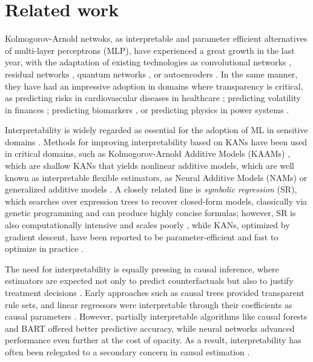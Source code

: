 \section{Related work}
\label{sec:related_work}

Kolmogorov-Arnold netwoks, as interpretable and parameter efficient alternatives of multi-layer perceptrons (MLP), have experienced a great growth in the last year, with the adaptation of existing technologies as convolutional networks \citep{bodner2024convolutional}, residual networks \citep{yu2024residual}, quantum networks \citep{wakaura2025enhanced}, or autoencoders \citep{moradi2024kolmogorovarnoldnetworkautoencoders}. In the same manner, they have had an impressive adoption in domains where transparency is critical, as predicting risks in cardiovascular diseases \citep{al2025kolmogorov} in healthcare \citep{pendyala25effectiveness, pati25kaam}; predicting volatility in finances \citep{CHO2025128781}; predicting biomarkers \citep{alharbi25biomarker}, or predicting physics in power systems \citep{Shuai_2025_powersystems}.

Interpretability is widely regarded as essential for the adoption of ML in sensitive domains \citep{DoshiVelez2017TowardsAR}. Methods for improving interpretability based on KANs have been used in critical domains, such as Kolmogorov-Arnold Additive Models (KAAMs) \citep{pati25kaam}, which are shallow KANs that yields nonlinear additive models, which are well known as interpretable flexible estimators, as Neural Additive Models (NAMs) \citep{agarwal21neural} or generalized additive models \citep{caruana2015intelligible}. A closely related line is \emph{symbolic regression} (SR), which searches over expression trees to recover closed-form models, classically via genetic programming \citep{schmidt09distilling} and can produce highly concise formulas; however, SR is also computationally intensive and scales poorly \citep{ZhangGPU2022}, while KANs, optimized by gradient descent, have been reported to be parameter-efficient and fast to optimize in practice \citep{liu2024kan}.

The need for interpretability is equally pressing in causal inference, where estimators are expected not only to predict counterfactuals but also to justify treatment decisions \citep{athey15recursive}. Early approaches such as causal trees \citep{athey15recursive} provided transparent rule sets, and linear regressors were interpretable through their coefficients as causal parameters \citep{hahn18regularization}. However, partially interpretable algorithms like causal forests \citep{Foster2011SubgroupIF} and BART \citep{hill11bayesian} offered better predictive accuracy, while neural networks advanced performance even further \citep{shalit2017estimating, johansson16learning, schwab2018perfect, yoon2018ganite, yao2018representation} at the cost of opacity. As a result, interpretability has often been relegated to a secondary concern in causal estimation \citep{Rudin2018StopEB}.

